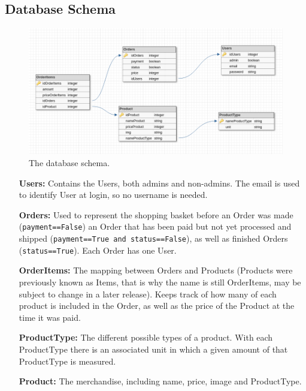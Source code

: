 \newpage

\subsection{Database Schema}

\begin{figure}[H]
  \centering
  \includegraphics[width=\textwidth]{second_sprint/db_schema.png}
  \caption{\label{fig:schema} The database schema.}
\end{figure}

\begin{itemize}
  \item[\textbf{Users:}] Contains the Users, both admins and non-admins. The
    email is used to identify User at login, so no username is needed.
  \item[\textbf{Orders:}] Used to represent the shopping basket before an
    Order was made (\texttt{payment==False}) an
    Order that has been paid but not yet processed and shipped
    (\texttt{payment==True and status==False}), as well as finished
    Orders (\texttt{status==True}). Each Order has one User.
  \item[\textbf{OrderItems:}] The mapping between Orders and Products
    (Products were previously known as Items, that is why the name is still
    OrderItems, may be subject to change in a later release). Keeps track
    of how many of each product is included in the Order, as well as the
    price of the Product at the time it was paid.
  \item[\textbf{ProductType:}] The different possible types of a product. With
    each ProductType there is an associated unit in which a given amount
    of that ProductType is measured.
  \item[\textbf{Product:}] The merchandise, including name, price, image and
    ProductType.
\end{itemize}
